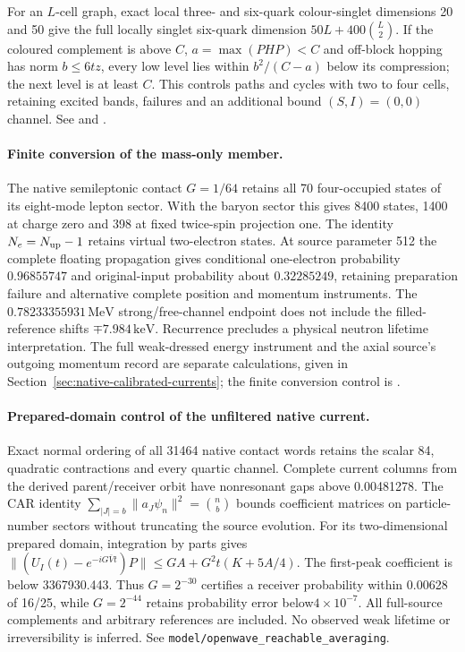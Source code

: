 For an $L$-cell graph, exact local three- and six-quark colour-singlet
dimensions 20 and 50 give the full locally singlet six-quark dimension
$50L+400\binom L2$. If the coloured complement is above $C$,
$a=\max(PHP)<C$ and off-block hopping has norm $b\leq6tz$,
every low level lies within $b^2/(C-a)$ below its compression; the
next level is at least $C$. This controls paths and cycles with two to
four cells, retaining excited bands, failures and an additional bound
$(S,I)=(0,0)$ channel. See 
and .

\paragraph{Finite conversion of the mass-only member.}
The native semileptonic contact $G=1/64$ retains all 70 four-occupied
states of its eight-mode lepton sector. With the baryon sector this gives
8400 states, 1400 at charge zero and 398 at fixed twice-spin projection
one. The identity $N_e=N_{\rm up}-1$ retains virtual two-electron states.
At source parameter 512 the complete floating propagation gives
conditional one-electron probability $0.96855747$ and original-input
probability about $0.32285249$, retaining preparation failure and
alternative complete position and momentum instruments. The
$0.78233355931\,\mathrm{MeV}$ strong/free-channel endpoint does not
include the filled-reference shifts $\mp7.984\,\mathrm{keV}$.
Recurrence precludes a physical neutron lifetime interpretation. The full weak-dressed energy instrument and
the axial source's outgoing momentum record are separate calculations,
given in Section~\ref{sec:native-calibrated-currents}; the finite
conversion control is .

\paragraph{Prepared-domain control of the unfiltered native current.}
Exact normal ordering of all 31464 native contact words retains the scalar 84,
quadratic contractions and every quartic channel. Complete current columns
from the derived parent/receiver orbit have nonresonant gaps above 0.00481278.
The CAR identity
$\sum_{|J|=b}\|a_J\psi_n\|^2=\binom nb$ bounds coefficient matrices on
particle-number sectors without truncating the source evolution.
For its two-dimensional prepared domain, integration by parts gives
$\|(U_I(t)-e^{-iG\overline Vt})P\|\leq GA+G^2t(K+5A/4)$.
The first-peak coefficient is below 3367930.443. Thus $G=2^{-30}$ certifies
a receiver probability within 0.00628 of 16/25, while $G=2^{-44}$ retains probability error below$4\times10^{-7}$.
All full-source complements and arbitrary references are included. No
observed weak lifetime or irreversibility is inferred. See \texttt{model/openwave\_reachable\_averaging}.


